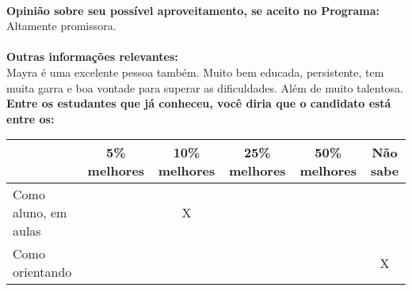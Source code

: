 \documentclass[11pt]{article}
\begin{document}
\\
\textbf{Opinião sobre seu possível aproveitamento, se aceito no Programa:}
\\Altamente promissora. \\ 
\\
\textbf{Outras informações relevantes:} \\Mayra é uma excelente pessoa também. Muito bem educada, persistente, tem muita garra e  boa vontade para superar as dificuldades. Além de muito talentosa. 
\\[0.3cm]
\textbf{Entre os estudantes que já conheceu, você diria que o candidato está entre os:}
\\
\begin{tabular}{|l|c|c|c|c|c|}
\hline
 & 5\% melhores & 10\% melhores & 25\% melhores & 50\% melhores & Não sabe \\
\hline
Como aluno, em aulas &  & X &  &  & \\
\hline
Como orientando &  &  &  &  & X\\
\hline
\end{tabular}
\end{document}
